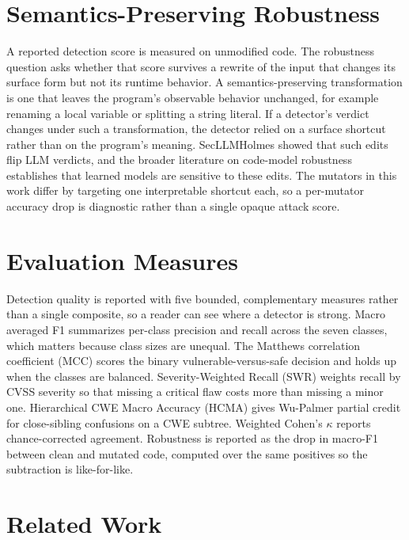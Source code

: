 \section{Semantics-Preserving Robustness}

A reported detection score is measured on unmodified code. The robustness
question asks whether that score survives a rewrite of the input that changes
its surface form but not its runtime behavior. A semantics-preserving
transformation is one that leaves the program's observable behavior unchanged,
for example renaming a local variable or splitting a string literal. If a
detector's verdict changes under such a transformation, the detector relied on a
surface shortcut rather than on the program's meaning. SecLLMHolmes
\cite{secllmholmes} showed that such edits flip LLM verdicts, and the broader
literature on code-model robustness \cite{yefet,bielik,henkel} establishes that
learned models are sensitive to these edits. The mutators in this work differ
by targeting one interpretable shortcut each, so a per-mutator accuracy drop is
diagnostic rather than a single opaque attack score.

\section{Evaluation Measures}

Detection quality is reported with five bounded, complementary measures rather
than a single composite, so a reader can see where a detector is strong. Macro
averaged F1 \cite{sokolova2009} summarizes per-class precision and recall across
the seven classes, which matters because class sizes are unequal. The Matthews
correlation coefficient (MCC) \cite{chicco2020mcc} scores the binary
vulnerable-versus-safe decision and holds up when the classes are balanced.
Severity-Weighted Recall (SWR) weights recall by CVSS severity so that missing a
critical flaw costs more than missing a minor one. Hierarchical CWE Macro
Accuracy (HCMA) gives Wu-Palmer \cite{wupalmer1994} partial credit for
close-sibling confusions on a CWE subtree. Weighted Cohen's $\kappa$
\cite{cohen1968kappa} reports chance-corrected agreement. Robustness is reported
as the drop in macro-F1 between clean and mutated code, computed over the same
positives so the subtraction is like-for-like.

\section{Related Work}

